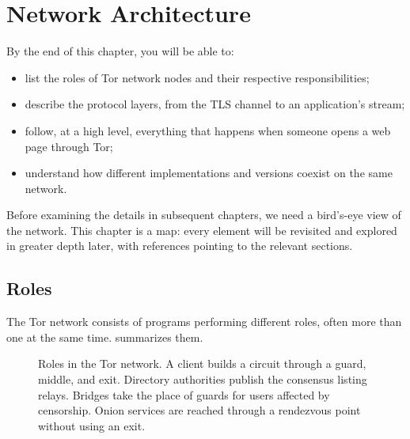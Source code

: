\chapter{Network Architecture}\label{cap:06-architettura}

\begin{obiettivi}
By the end of this chapter, you will be able to:
\begin{itemize}[nosep]
  \item list the roles of Tor network nodes and their respective responsibilities;
  \item describe the protocol layers, from the TLS channel to an application's stream;
  \item follow, at a high level, everything that happens when someone opens a web page through Tor;
  \item understand how different implementations and versions coexist on the same network.
\end{itemize}
\end{obiettivi}

Before examining the details in subsequent chapters, we need a bird's-eye view of the network. This chapter is a map: every element will be revisited and explored in greater depth later, with references pointing to the relevant sections.

\section{Roles}\label{sec:arch-ruoli}

The Tor network consists of programs performing different roles, often more than one at the same time.  summarizes them.

\begin{figure}[htbp]
\centering

\caption{Roles in the Tor network. A client builds a circuit through a guard, middle, and exit. Directory authorities publish the consensus listing relays. Bridges take the place of guards for users affected by censorship. Onion services are reached through a rendezvous point without using an exit.}
\label{fig:arch-ruoli}
\end{figure}

